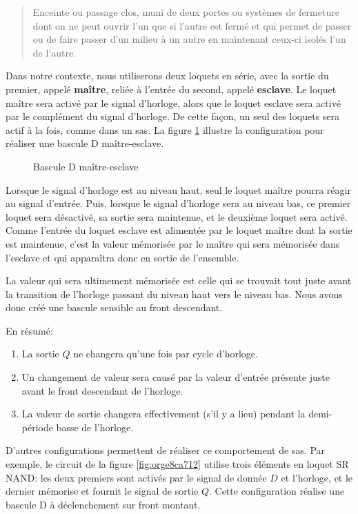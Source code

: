 \documentclass[11pt]{article}
\begin{document}
\begin{quote}
Enceinte ou passage clos, muni de deux portes ou systèmes de fermeture
dont on ne peut ouvrir l'un que si l'autre est fermé et qui permet de
passer ou de faire passer d'un milieu à un autre en maintenant ceux-ci
isolés l'un de l'autre.
\end{quote}

Dans notre contexte, nous utiliserons deux loquets en série, avec la
sortie du premier, appelé \textbf{maître}, reliée à l'entrée du second,
appelé \textbf{esclave}. Le loquet maître sera activé par le signal d'horloge,
alors que le loquet esclave sera activé par le complément du signal
d'horloge. De cette façon, un seul des loquets sera actif à la fois,
comme dans un sas. La figure \ref{fig:org543f580} illustre la
configuration pour réaliser une bascule D maître-esclave.

\begin{figure}[htbp]
\centering

\caption{\label{fig:org543f580}Bascule D maître-esclave}
\end{figure}

Lorsque le signal d'horloge est au niveau haut, seul le loquet maître
pourra réagir au signal d'entrée. Puis, lorsque le signal d'horloge
sera au niveau bas, ce premier loquet sera désactivé, sa sortie sera
maintenue, et le deuxième loquet sera activé. Comme l'entrée du loquet
esclave est alimentée par le loquet maître dont la sortie est
maintenue, c'est la valeur mémorisée par le maître qui sera mémorisée
dans l'esclave et qui apparaîtra donc en sortie de l'ensemble.

La valeur qui sera ultimement mémorisée est celle qui se trouvait tout
juste avant la transition de l'horloge passant du niveau haut vers le
niveau bas. Nous avons donc créé une bascule sensible au front
descendant.

En résumé:
\begin{enumerate}
\item La sortie \(Q\) ne changera qu'une fois par cycle d'horloge.
\item Un changement de valeur sera causé par la valeur d'entrée présente
juste avant le front descendant de l'horloge.
\item La valeur de sortie changera effectivement (s'il y a lieu) pendant
la demi-période basse de l'horloge.
\end{enumerate}

D'autres configurations permettent de réaliser ce comportement de
sas. Par exemple, le circuit de la figure \ref{fig:orge8ca712} utilise
trois éléments en loquet SR NAND: les deux premiers sont activés par
le signal de donnée \(D\) et l'horloge, et le dernier mémorise et
fournit le signal de sortie \(Q\). Cette configuration réalise une
bascule D à déclenchement sur front montant.
\end{document}
